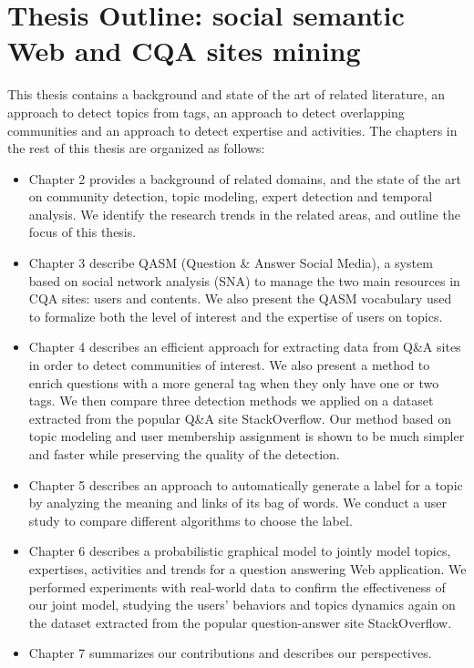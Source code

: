 \section{Thesis Outline: social semantic Web and CQA sites mining}
This thesis contains a background and state of the art of related literature, an approach to detect topics from tags, an approach to detect overlapping communities and an approach to detect expertise and activities. The chapters in the rest of this thesis are organized as follows:
\begin{itemize}

\item{Chapter 2} provides a background of related domains, and the state of the art on community detection, topic modeling, expert detection and temporal analysis. We identify the research trends in the related areas, and outline the focus of this thesis.
\item{Chapter 3} describe QASM (Question \& Answer Social Media), a system based on social network analysis (SNA) to manage the two main resources in CQA sites: users and contents. We also present the QASM vocabulary used to formalize both the level of interest and the expertise of users on topics. 
\item{Chapter 4} describes an efficient approach for extracting data from Q\&A sites in order to detect communities of interest. We also present a method to enrich questions with a more general tag when they only have one or two tags. We then compare three detection methods we applied on a dataset extracted from the popular Q\&A site StackOverflow. Our method based on topic modeling and user membership assignment is shown to be much simpler and faster while preserving the quality of the detection. 
\item{Chapter 5} describes an approach to automatically generate a label for a topic by analyzing the meaning and links of its bag of words. We conduct a user study to compare different algorithms to choose the label.
\item{Chapter 6} describes a probabilistic graphical model to jointly model topics, expertises, activities and trends for a question answering Web application. We performed experiments with real-world data to confirm the effectiveness of our joint model, studying the users' behaviors and topics dynamics again on the dataset extracted from the popular question-answer site StackOverflow.
\item{Chapter 7} summarizes our contributions and describes our perspectives.
\end{itemize}



